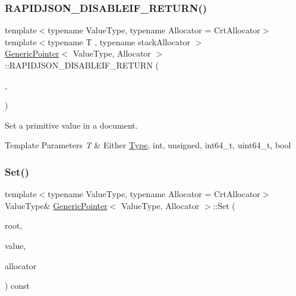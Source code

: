 \subsubsection{\texorpdfstring{R\+A\+P\+I\+D\+J\+S\+O\+N\+\_\+\+D\+I\+S\+A\+B\+L\+E\+I\+F\+\_\+\+R\+E\+T\+U\+R\+N()}{RAPIDJSON\_DISABLEIF\_RETURN()}\hspace{0.1cm}{\footnotesize\ttfamily [3/3]}}
{\footnotesize\ttfamily template$<$typename Value\+Type, typename Allocator = Crt\+Allocator$>$ \\
template$<$typename T , typename stack\+Allocator $>$ \\
\hyperlink{a02232}{Generic\+Pointer}$<$ Value\+Type, Allocator $>$\+::R\+A\+P\+I\+D\+J\+S\+O\+N\+\_\+\+D\+I\+S\+A\+B\+L\+E\+I\+F\+\_\+\+R\+E\+T\+U\+RN (\begin{DoxyParamCaption}\item[{(internal\+::\+Or\+Expr$<$ internal\+::\+Is\+Pointer$<$ T $>$, \hyperlink{a02020}{internal\+::\+Is\+Generic\+Value}$<$ T $>$ $>$)}]{,  }\item[{(Value\+Type \&)}]{ }\end{DoxyParamCaption})}



Set a primitive value in a document. 


\begin{DoxyTemplParams}{Template Parameters}
{\em T} & Either \hyperlink{a00560_a1d1cfd8ffb84e947f82999c682b666a7}{Type}, {\ttfamily int}, {\ttfamily unsigned}, {\ttfamily int64\+\_\+t}, {\ttfamily uint64\+\_\+t}, {\ttfamily bool} \\
\hline
\end{DoxyTemplParams}
\mbox{\label{a02232_a71476d125a276b62a246990da1bd3468}} 
\subsubsection{\texorpdfstring{Set()}{Set()}}
{\footnotesize\ttfamily template$<$typename Value\+Type, typename Allocator = Crt\+Allocator$>$ \\
Value\+Type\& \hyperlink{a02232}{Generic\+Pointer}$<$ Value\+Type, Allocator $>$\+::Set (\begin{DoxyParamCaption}\item[{Value\+Type \&}]{root,  }\item[{Value\+Type \&}]{value,  }\item[{typename Value\+Type\+::\+Allocator\+Type \&}]{allocator }\end{DoxyParamCaption}) const\hspace{0.3cm}{\ttfamily [inline]}}



